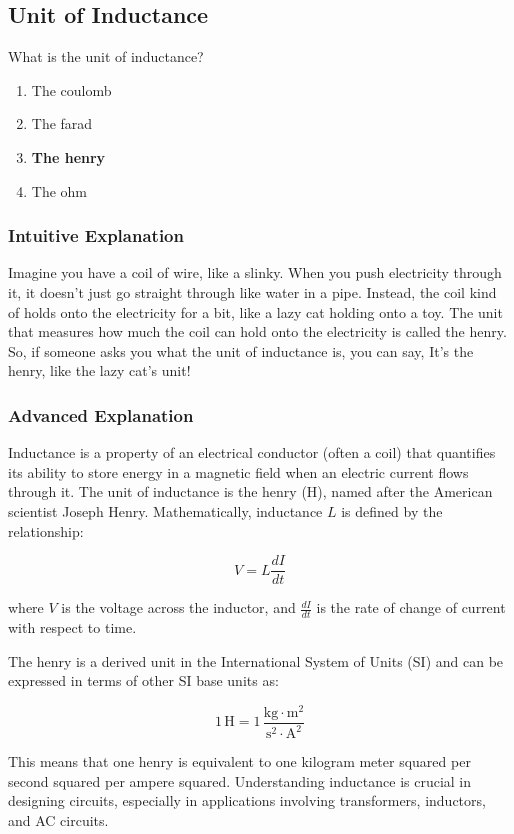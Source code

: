 \subsection{Unit of Inductance}
\label{T5C04}

\begin{tcolorbox}[colback=gray!10!white,colframe=black!75!black,title=T5C04]
What is the unit of inductance?
\begin{enumerate}[label=\Alph*)]
    \item The coulomb
    \item The farad
    \item \textbf{The henry}
    \item The ohm
\end{enumerate}
\end{tcolorbox}

\subsubsection{Intuitive Explanation}
Imagine you have a coil of wire, like a slinky. When you push electricity through it, it doesn't just go straight through like water in a pipe. Instead, the coil kind of holds onto the electricity for a bit, like a lazy cat holding onto a toy. The unit that measures how much the coil can hold onto the electricity is called the henry. So, if someone asks you what the unit of inductance is, you can say, It's the henry, like the lazy cat's unit!

\subsubsection{Advanced Explanation}
Inductance is a property of an electrical conductor (often a coil) that quantifies its ability to store energy in a magnetic field when an electric current flows through it. The unit of inductance is the henry (H), named after the American scientist Joseph Henry. Mathematically, inductance \( L \) is defined by the relationship:

\[
V = L \frac{dI}{dt}
\]

where \( V \) is the voltage across the inductor, and \( \frac{dI}{dt} \) is the rate of change of current with respect to time. 

The henry is a derived unit in the International System of Units (SI) and can be expressed in terms of other SI base units as:

\[
1 \, \text{H} = 1 \, \frac{\text{kg} \cdot \text{m}^2}{\text{s}^2 \cdot \text{A}^2}
\]

This means that one henry is equivalent to one kilogram meter squared per second squared per ampere squared. Understanding inductance is crucial in designing circuits, especially in applications involving transformers, inductors, and AC circuits.

